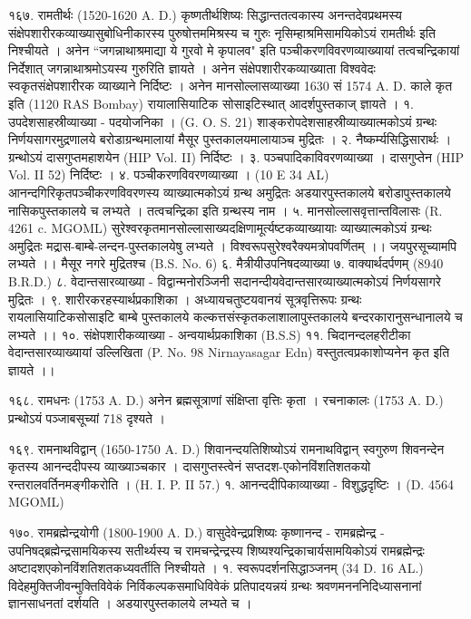१६७. रामतीर्थः (1520-1620 A. D.)
कृष्णतीर्थशिष्यः सिद्धान्ततत्वकास्य अनन्तदेवप्रथमस्य संक्षेपशारीरकव्याख्यासुबोधिनीकारस्य पुरुषोत्तममिश्रस्य च गुरुः नृसिम्हाश्रमिसामयिकोऽयं रामतीर्थः इति निश्चीयते । अनेन ``जगन्नाथाश्रमाद्या ये गुरवो मे कृपालव" इति पञ्चीकरणविवरणव्याख्यायां तत्वचन्द्रिकायां निर्देशात् जगन्नाथाश्रमोऽयस्य गुरुरिति ज्ञायते । अनेन संक्षेपशारीरकव्याख्याता विश्ववेदः स्वकृतसंक्षेपशारीरक व्याख्याने निर्दिष्टः । अनेन मानसोल्लासव्याख्या 1630 सं 1574 A. D. काले कृत इति (1120 RAS Bombay) रायालासियाटिक सोसाइटिस्थात् आदर्शपुस्तकाज् ज्ञायते ।
१. उपदेशसाहस्रीव्याख्या - पदयोजनिका । (G. O. S. 21)
शाङ्करोपदेशसाहस्रीव्याख्यात्मकोऽयं ग्रन्थः निर्णयसागरमुद्रणालये बरोडाग्रन्थमालायां मैसूर पुस्तकालयमालायाञ्च मुद्रितः ।
२. नैष्कर्म्यसिद्धिसारार्थः । ग्रन्थोऽयं दासगुप्तमहाशयेन (HIP Vol. II) निर्दिष्टः ।
३. पञ्चपादिकाविवरणव्याख्या । दासगुप्तेन (HIP Vol. II 52) निर्दिष्टः ।
४. पञ्चीकरणविवरणव्याख्या । (10 E 34 AL)
आनन्दगिरिकृतपञ्चीकरणविवरणस्य व्याख्यात्मकोऽयं ग्रन्थ अमुद्रितः अडयारपुस्तकालये बरोडापुस्तकालये नासिकपुस्तकालये च लभ्यते । तत्वचन्द्रिका इति ग्रन्थस्य नाम ।
५. मानसोल्लासवृत्तान्तविलासः (R. 4261 c. MGOML)
सुरेश्वरकृतमानसोल्लासाख्यदक्षिणामूर्त्यष्टकव्याख्यायाः व्याख्यात्मकोऽयं ग्रन्थः अमुद्रितः मद्रास-बाम्बे-लन्दन-पुस्तकालयेषु लभ्यते । विश्वरूपसुरेश्वरैक्यमत्रोपवर्णितम् ।। जयपुरसूच्यामपि लभ्यते ।। मैसूर नगरे मुद्रितश्च (B.S. No. 6) 
६. मैत्रीयीउपनिषदव्याख्या
७. वाक्यार्थदर्पणम् (8940 B.R.D.)
८. वेदान्तसारव्याख्या - विद्वान्मनोरञ्जिनी सदानन्दीयवेदान्तसारव्याख्यात्मकोऽयं निर्णयसागरे मुद्रितः ।
९. शारीरकरहस्यार्थप्रकाशिका । अध्यायचतुष्टयवानयं सूत्रवृत्तिरूपः ग्रन्थः रायलासियाटिकसोसाइटि बाम्बे पुस्तकालये कल्कत्तसंस्कृतकलाशालापुस्तकालये बन्दरकारानुसन्धानालये च लभ्यते ।।
१०. संक्षेपशारीकव्याख्या - अन्वयार्थप्रकाशिका (B.S.S)
११. चिदानन्दलहरीटीका वेदान्तसारव्याख्यायां उल्लिखिता (P. No. 98 Nirnayasagar Edn) वस्तुतत्वप्रकाशोप्यनेन कृत इति ज्ञायते ।।

१६८. रामधनः (1753 A. D.)
अनेन ब्रह्मसूत्राणां संक्षिप्ता वृत्तिः कृता । रचनाकालः (1753 A. D.) प्रन्थोऽयं पञ्जाबसूच्यां 718 दृश्यते ।

१६९. रामनाथविद्वान् (1650-1750 A. D.)
शिवानन्दयतिशिष्योऽयं रामनाथविद्वान् स्वगुरुण शिवनन्देन कृतस्य आनन्ददीपस्य व्याख्याञ्चकार । दासगुप्तस्त्वेनं सप्तदश-एकोनविंशतिशतकयो रन्तरालवर्तिनमङ्गीकरोति । (H. I. P. II 57.)
१. आनन्ददीपिकाव्याख्या - विशुद्धदृष्टिः । (D. 4564 MGOML)

१७०. रामब्रह्मेन्द्रयोगी (1800-1900 A. D.)
वासुदेवेन्द्रप्रशिष्यः कृष्णानन्द - रामब्रह्मेन्द्र - उपनिषद्ब्रह्मेन्द्रसामयिकस्य सतीर्थ्यस्य च रामचन्द्रेन्द्रस्य शिष्यश्यन्द्रिकाचार्यसामयिकोऽयं रामब्रह्मेन्द्रः अष्टादशएकोनविंशतिशतकध्यवर्तीति निश्चीयते ।
१. स्वरूपदर्शनसिद्धाञ्जनम् (34 D. 16 AL.)
विदेहमुक्तिजीवन्मुक्तिविवेकं निर्विकल्पकसमाधिविवेकं प्रतिपादयन्नयं ग्रन्थः श्रवणमनननिदिध्यासनानां ज्ञानसाधनतां दर्शयति । अडयारपुस्तकालये लभ्यते च ।

